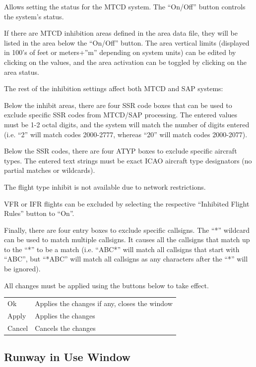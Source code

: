 \documentclass[11pt,a4paper,oldfontcommands]{memoir}
\begin{document}
Allows setting the status for the MTCD system. The “On/Off” button controls the system’s status.

If there are MTCD inhibition areas defined in the area data file, they will be listed in the area below the “On/Off” button. The area vertical limits (displayed in 100’s of feet or meters+”m” depending on system units) can be edited by clicking on the values, and the area activation can be toggled by clicking on the area status.

The rest of the inhibition settings affect both MTCD and SAP systems:

Below the inhibit areas, there are four SSR code boxes that can be used to exclude specific SSR codes from MTCD/SAP processing. The entered values must be 1-2 octal digits, and the system will match the number of digits entered (i.e. “2” will match codes 2000-2777, whereas “20” will match codes 2000-2077).

Below the SSR codes, there are four ATYP boxes to exclude specific aircraft types. The entered text strings must be exact ICAO aircraft type designators (no partial matches or wildcards).

The flight type inhibit is not available due to network restrictions.

VFR or IFR flights can be excluded by selecting the respective “Inhibited Flight Rules” button to “On”.

Finally, there are four entry boxes to exclude specific callsigns. The “*” wildcard can be used to match multiple callsigns. It causes all the callsigns that match up to the “*” to be a match (i.e. “ABC*” will match all callsigns that start with “ABC”, but “*ABC” will match all callsigns as any characters after the “*” will be ignored).

All changes must be applied using the buttons below to take effect.

\begin{tabular}{l l}
    Ok      & Applies the changes if any, closes the window\\
    Apply   & Applies the changes\\
    Cancel  & Cancels the changes\\
\end{tabular}

\subsection{Runway in Use Window}
\label{win:riuw}
\end{document}
